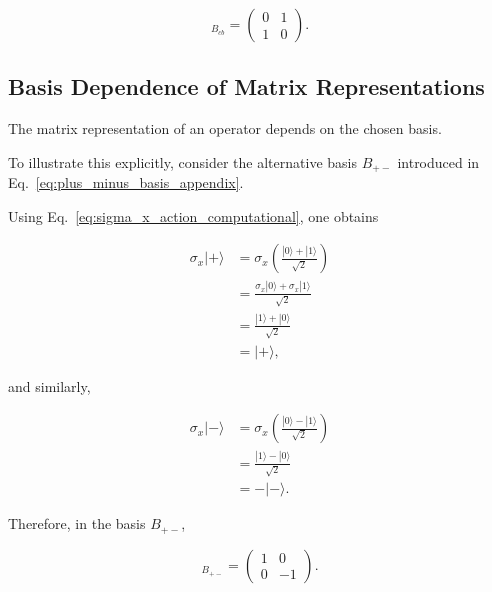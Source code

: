 \begin{equation}
[\sigma_x]_{B_{cb}}
=
\begin{pmatrix}
0 & 1 \\
1 & 0
\end{pmatrix}.
\label{eq:sigma_x_matrix_computational}
\end{equation}


\subsection*{Basis Dependence of Matrix Representations}

The matrix representation of an operator depends on the chosen basis.

To illustrate this explicitly, consider the alternative basis \( B_{+-} \) introduced in Eq.~\eqref{eq:plus_minus_basis_appendix}.

Using Eq.~\eqref{eq:sigma_x_action_computational}, one obtains

\begin{align}
\sigma_x |+\rangle
&=
\sigma_x
\left(
\frac{|0\rangle+|1\rangle}{\sqrt{2}}
\right)
\nonumber
\\
&=
\frac{
\sigma_x|0\rangle
+
\sigma_x|1\rangle
}{\sqrt{2}}
\nonumber
\\
&=
\frac{
|1\rangle+|0\rangle
}{\sqrt{2}}
\nonumber
\\
&=
|+\rangle,
\end{align}

and similarly,

\begin{align}
\sigma_x |-\rangle
&=
\sigma_x
\left(
\frac{|0\rangle-|1\rangle}{\sqrt{2}}
\right)
\nonumber
\\
&=
\frac{
|1\rangle-|0\rangle
}{\sqrt{2}}
\nonumber
\\
&=
-|-\rangle.
\end{align}

Therefore, in the basis \( B_{+-} \),

\begin{equation}
[\sigma_x]_{B_{+-}}
=
\begin{pmatrix}
1 & 0 \\
0 & -1
\end{pmatrix}.
\label{eq:sigma_x_matrix_plus_minus}
\end{equation}

